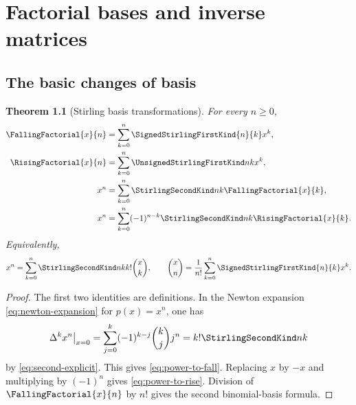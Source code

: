 \documentclass[11pt,a4paper,oneside,openany]{book}
\newtheorem{theorem}{Theorem}[chapter]
\theoremstyle{definition}
\theoremstyle{remark}
\begin{document}
\chapter{Factorial bases and inverse matrices}
\label{ch:bases}

\section{The basic changes of basis}
\begin{theorem}[Stirling basis transformations]\label{thm:stirling-basis}
For every $n\ge0$,
\begin{align}
 \FallingFactorial{x}{n}&=\sum_{k=0}^n\SignedStirlingFirstKind{n}{k}x^k,\label{eq:fall-to-power}\\
 \RisingFactorial{x}{n}&=\sum_{k=0}^n\UnsignedStirlingFirstKind nkx^k,\label{eq:rise-to-power}\\
 x^n&=\sum_{k=0}^n\StirlingSecondKind nk\FallingFactorial{x}{k},\label{eq:power-to-fall}\\
 x^n&=\sum_{k=0}^n(-1)^{n-k}\StirlingSecondKind nk\RisingFactorial{x}{k}.\label{eq:power-to-rise}
\end{align}
Equivalently,
\begin{equation}\label{eq:binomial-basis}
 x^n=\sum_{k=0}^n\StirlingSecondKind nk k!\binom{x}{k},\qquad
 \binom{x}{n}=\frac1{n!}\sum_{k=0}^n\SignedStirlingFirstKind{n}{k}x^k.
\end{equation}
\end{theorem}
\begin{proof}
The first two identities are definitions.  In the Newton expansion
\cref{eq:newton-expansion} for $p(x)=x^n$, one has
\[
 \Delta^kx^n\big|_{x=0}=\sum_{j=0}^k(-1)^{k-j}\binom kjj^n
 =k!\StirlingSecondKind nk
\]
by \cref{eq:second-explicit}.  This gives \cref{eq:power-to-fall}.  Replacing $x$
by $-x$ and multiplying by $(-1)^n$ gives \cref{eq:power-to-rise}.  Division of
$\FallingFactorial{x}{n}$ by $n!$ gives the second binomial-basis formula.
\end{proof}
\end{document}
